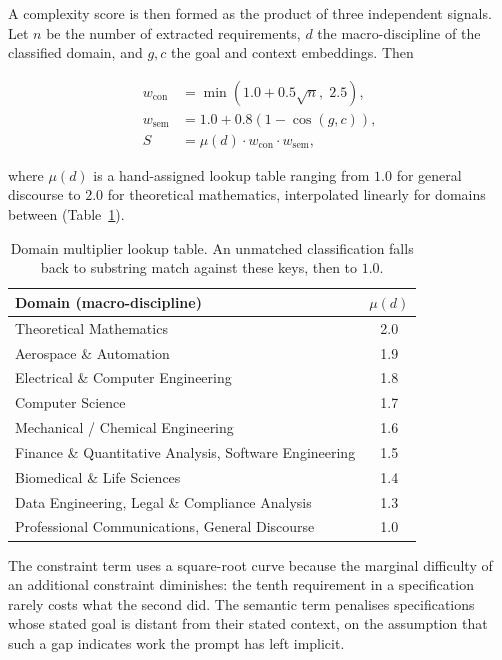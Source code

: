 \documentclass[11pt]{article}
\begin{document}
A complexity score is then formed as the product of three independent signals.
Let $n$ be the number of extracted requirements, $d$ the macro-discipline of
the classified domain, and $g, c$ the goal and context embeddings. Then

\begin{align}
w_{\text{con}} &= \min\!\left(1.0 + 0.5\sqrt{n},\; 2.5\right), \\
w_{\text{sem}} &= 1.0 + 0.8\left(1 - \cos(g, c)\right), \\
S &= \mu(d)\cdot w_{\text{con}} \cdot w_{\text{sem}},
\end{align}

where $\mu(d)$ is a hand-assigned lookup table ranging from $1.0$ for general
discourse to $2.0$ for theoretical mathematics, interpolated linearly for
domains between (Table~\ref{tab:domain}).

\begin{table}[h]
\centering
\small
\begin{tabular}{@{}lc@{}}
\toprule
Domain (macro-discipline) & $\mu(d)$ \\
\midrule
Theoretical Mathematics & 2.0 \\
Aerospace \& Automation & 1.9 \\
Electrical \& Computer Engineering & 1.8 \\
Computer Science & 1.7 \\
Mechanical / Chemical Engineering & 1.6 \\
Finance \& Quantitative Analysis, Software Engineering & 1.5 \\
Biomedical \& Life Sciences & 1.4 \\
Data Engineering, Legal \& Compliance Analysis & 1.3 \\
Professional Communications, General Discourse & 1.0 \\
\bottomrule
\end{tabular}
\caption{Domain multiplier lookup table. An unmatched classification falls
back to substring match against these keys, then to $1.0$.}
\label{tab:domain}
\end{table}

The constraint term uses a square-root curve because the marginal difficulty
of an additional constraint diminishes: the tenth requirement in a
specification rarely costs what the second did. The semantic term penalises
specifications whose stated goal is distant from their stated context, on the
assumption that such a gap indicates work the prompt has left implicit.
\end{document}
